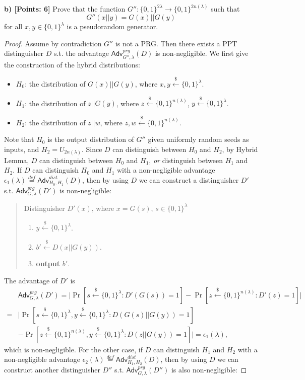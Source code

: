 \documentclass[12pt]{article}
\newcommand{\eqdef}{\stackrel{def}{=}}
\newcommand{\bits}{\{0,1\}}
\newcommand{\getsr}{\stackrel{\$}{\gets}}
\newcommand{\Adv}{\textsf{Adv}}
\theoremstyle{definition}
\begin{document}
{\bf b) [Points: 6]} Prove that the function $G'' : \bits^{2\lambda} \to \bits^{2n(\lambda)}$ such that
$$G''(x||y) = G(x)||G(y)$$
for all $x,y\in\bits^\lambda$ is a pseudorandom generator.
\begin{proof}
Assume by contradiction $G''$ is not a PRG. Then there exists a PPT distinguisher $D$ s.t. the advantage $\Adv_{G'',\lambda}^{prg}(D)$ is non-negligible. We first give the construction of the hybrid distributions:
\begin{itemize}
\item $H_0$: the distribution of $G(x)||G(y)$, where $x, y \getsr\bits^\lambda$.
\item $H_1$: the distribution of $z||G(y)$, where $z\getsr\bits^{n(\lambda)}$, $y\getsr\bits^\lambda$.
\item $H_2$: the distribution of $z||w$, where $z,w\getsr\bits^{n(\lambda)}$.
\end{itemize}
Note that $H_0$ is the output distribution of $G''$ given uniformly random seeds as inputs, and $H_2 = U_{2n(\lambda)}$.
Since $D$ can distinguish between $H_0$ and $H_2$, by Hybrid Lemma, $D$ can distinguish between $H_0$ and $H_1$, \emph{or} distinguish between $H_1$ and $H_2$. If $D$ can distinguish $H_0$ and $H_1$ with a non-negligible advantage $\epsilon_1(\lambda) \eqdef \Adv_{H_0,H_1}^{dist}(D)$, then by using $D$ we can construct a distinguisher $D'$ s.t. $\Adv_{G,\lambda}^{prg}(D')$ is non-negligible:
\begin{quote}
Distinguisher $D' (x)$, where $x=G(s)$, $s\in\bits^\lambda$
\begin{enumerate}
\item $y\getsr\bits^{\lambda}$.
\item $b' \getsr D(x||G(y))$.
\item {\bf output} $b'$.
\end{enumerate}
\end{quote}
The advantage of $D'$ is 
$$
\begin{aligned}
& \Adv_{G,\lambda}^{prg}(D') 
= \bigg| \Pr[s\getsr\bits^\lambda : D'(G(s))=1] - \Pr[z\getsr\bits^{n(\lambda)}: D'(z)=1] \bigg| \\
=& \bigg| \Pr[s\getsr\bits^\lambda, y\getsr\bits^\lambda : D(G(s)||G(y))=1]\\
& - \Pr[z\getsr\bits^{n(\lambda)}, y\getsr\bits^\lambda: D(z||G(y))=1] \bigg| 
= \epsilon_1(\lambda),
\end{aligned}
$$
which is non-negligible. For the other case, if $D$ can distinguish $H_1$ and $H_2$ with a non-negligible advantage $\epsilon_2(\lambda) \eqdef \Adv_{H_1,H_2}^{dist}(D)$, then by using $D$ we can construct another distinguisher $D''$ s.t. $\Adv_{G,\lambda}^{prg}(D'')$ is also non-negligible:

\end{proof}
\end{document}
